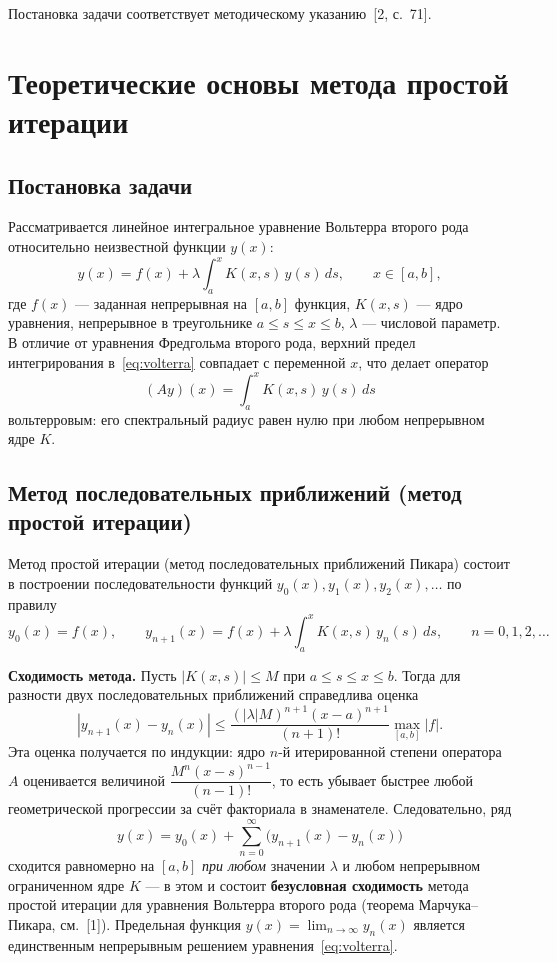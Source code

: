 \documentclass[a4paper,14pt]{extarticle}
\begin{document}
Постановка задачи соответствует методическому указанию~[2, с.~71].

\section{Теоретические основы метода простой итерации}

\subsection{Постановка задачи}

Рассматривается линейное интегральное уравнение Вольтерра второго рода относительно неизвестной функции $y(x)$:
\begin{equation}
y(x) = f(x) + \lambda \int_{a}^{x} K(x,s)\, y(s)\, ds, \qquad x \in [a,b],
\label{eq:volterra}
\end{equation}
где $f(x)$ --- заданная непрерывная на $[a,b]$ функция, $K(x,s)$ --- ядро уравнения, непрерывное в треугольнике $a \le s \le x \le b$, $\lambda$ --- числовой параметр. В отличие от уравнения Фредгольма второго рода, верхний предел интегрирования в~\eqref{eq:volterra} совпадает с переменной $x$, что делает оператор
\[
(A y)(x) = \int_a^x K(x,s)\, y(s)\, ds
\]
вольтерровым: его спектральный радиус равен нулю при любом непрерывном ядре $K$.

\subsection{Метод последовательных приближений (метод простой итерации)}

Метод простой итерации (метод последовательных приближений Пикара) состоит в построении последовательности функций $y_0(x), y_1(x), y_2(x), \dots$ по правилу
\begin{equation}
y_0(x) = f(x), \qquad
y_{n+1}(x) = f(x) + \lambda \int_a^x K(x,s)\, y_n(s)\, ds, \qquad n = 0,1,2,\dots
\label{eq:picard}
\end{equation}

\textbf{Сходимость метода.} Пусть $|K(x,s)| \le M$ при $a \le s \le x \le b$. Тогда для разности двух последовательных приближений справедлива оценка
\[
|y_{n+1}(x) - y_n(x)| \le \frac{(|\lambda| M)^{n+1} (x-a)^{n+1}}{(n+1)!} \max_{[a,b]} |f|.
\]
Эта оценка получается по индукции: ядро $n$-й итерированной степени оператора $A$ оценивается величиной $\dfrac{M^n (x-s)^{n-1}}{(n-1)!}$, то есть убывает быстрее любой геометрической прогрессии за счёт факториала в знаменателе. Следовательно, ряд
\[
y(x) = y_0(x) + \sum_{n=0}^{\infty} \bigl(y_{n+1}(x) - y_n(x)\bigr)
\]
сходится равномерно на $[a,b]$ \emph{при любом} значении $\lambda$ и любом непрерывном ограниченном ядре $K$ --- в этом и состоит \textbf{безусловная сходимость} метода простой итерации для уравнения Вольтерра второго рода (теорема Марчука--Пикара, см.~[1]). Предельная функция $y(x) = \lim_{n\to\infty} y_n(x)$ является единственным непрерывным решением уравнения~\eqref{eq:volterra}.
\end{document}
